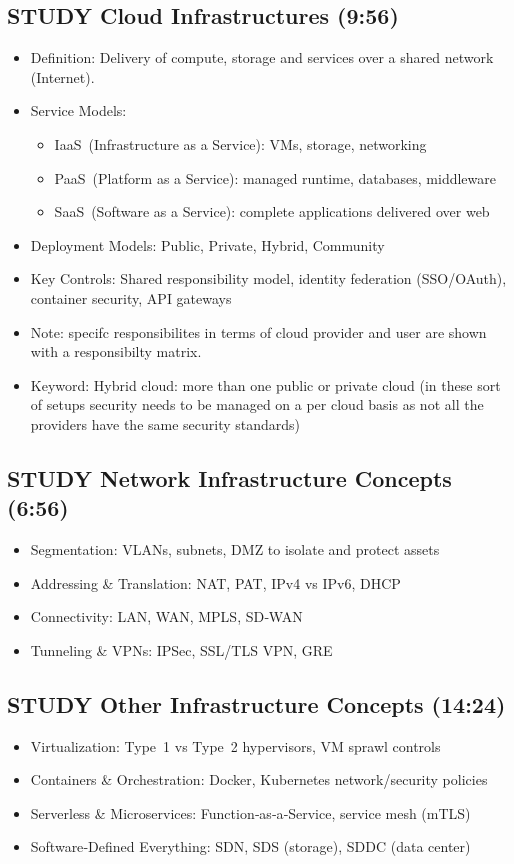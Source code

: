 \documentclass[11pt]{article}
\begin{document}
\subsection{{\bfseries\sffamily STUDY} Cloud Infrastructures (9:56)}
\label{sec:org71f9f34}
\begin{itemize}
\item Definition: Delivery of compute, storage and services over a shared network (Internet).
\item Service Models:
\begin{itemize}
\item IaaS (Infrastructure as a Service): VMs, storage, networking
\item PaaS (Platform as a Service): managed runtime, databases, middleware
\item SaaS (Software as a Service): complete applications delivered over web
\end{itemize}
\item Deployment Models: Public, Private, Hybrid, Community
\item Key Controls: Shared responsibility model, identity federation (SSO/OAuth), container security, API gateways
\item Note: specifc responsibilites in terms of cloud provider and user are shown with a responsibilty matrix.
\item Keyword: Hybrid cloud: more than one public or private cloud (in these sort of setups security needs to be managed on a per cloud basis as not all the providers have the same security standards)
\end{itemize}
\subsection{{\bfseries\sffamily STUDY} Network Infrastructure Concepts (6:56)}
\label{sec:org20a6f15}
\begin{itemize}
\item Segmentation: VLANs, subnets, DMZ to isolate and protect assets
\item Addressing \& Translation: NAT, PAT, IPv4 vs IPv6, DHCP
\item Connectivity: LAN, WAN, MPLS, SD‑WAN
\item Tunneling \& VPNs: IPSec, SSL/TLS VPN, GRE
\end{itemize}
\subsection{{\bfseries\sffamily STUDY} Other Infrastructure Concepts (14:24)}
\label{sec:orgf36d67e}
\begin{itemize}
\item Virtualization: Type 1 vs Type 2 hypervisors, VM sprawl controls
\item Containers \& Orchestration: Docker, Kubernetes network/security policies
\item Serverless \& Microservices: Function‑as‑a‑Service, service mesh (mTLS)
\item Software‑Defined Everything: SDN, SDS (storage), SDDC (data center)
\end{itemize}
\end{document}
